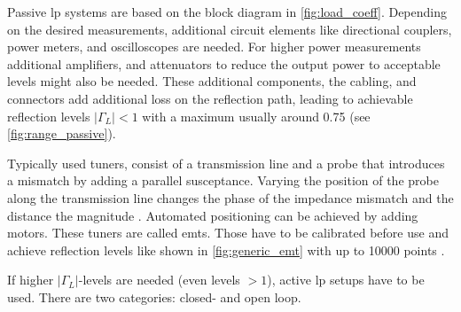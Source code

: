 \documentclass[12pt,a4paper,parskip=full,abstract=true,BCOR=10mm,twoside,open=right]{scrreprt}
\providecommand{\abs}[1]{\lvert#1\rvert}
\begin{document}
Passive \gls{lp} systems are based on the block diagram in \cref{fig:load_coeff}. Depending on
the desired measurements, additional circuit elements like directional couplers,
power meters, and oscilloscopes are needed. For higher power measurements additional
amplifiers, and attenuators to reduce the output power to acceptable levels might also
be needed. These additional components, the cabling, and connectors add additional loss
on the reflection path, leading to achievable reflection levels $\abs{\Gamma_L} < 1$ with
a maximum usually around 0.75 \cite{de_groote_introduction_2008} (see \cref{fig:range_passive}).

Typically used tuners, consist of a transmission line and a probe that introduces a mismatch
by adding a parallel susceptance. Varying the position of the probe along the transmission
line changes the phase of the impedance mismatch and the distance the magnitude \cite{hashmi_highly_2011}.
Automated positioning can be achieved by adding motors. These tuners are called \glspl{emt}.
Those have to be calibrated before use and achieve reflection levels like shown in
\cref{fig:generic_emt} with up to 10000 points \cite{ghannouchi_load-pull_2013}.

If higher $\abs{\Gamma_L}$-levels  are needed (even levels $> 1$), active \gls{lp} setups
have to be used. There are two categories: closed- and open loop.
\end{document}
